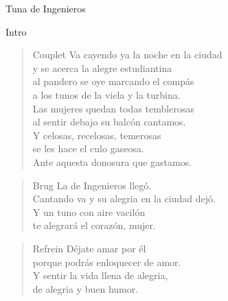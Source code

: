 \begin{song}{Tuna de Ingenieros}

\begin{instrumental}{Intro}
   
   
   
   
\end{instrumental}

\begin{verse}{Couplet}
Va cayendo ya la noche en la ciudad\\
y se acerca la alegre estudiantina\\
al pandero se oye marcando el compás\chord{}\\
a los tunos de la viela y la turbina.\\
Las mujeres quedan todas temblerosas\chord{}\\
al sentir debajo su balcón cantamos.\\
Y celosas, recelosas, temerosas\\
se les hace el culo gaseosa.\\
Ante aquesta donosura que gastamos.
\end{verse}

\begin{verse}{Brug}
\hspace{4em}La de Ingenieros llegó.\\
Cantando va y su alegria en la ciudad dejó.\\
Y un tuno con aire vacilón\chord{}\\
te alegrará el corazón, mujer.
\end{verse}

\begin{verse}{Refrein}
Déjate amar por él\\
porque podrás enloquecer de amor.\\
Y sentir la vida llena de alegria,\\
de alegria y buen humor.
\end{verse}

\end{song}

